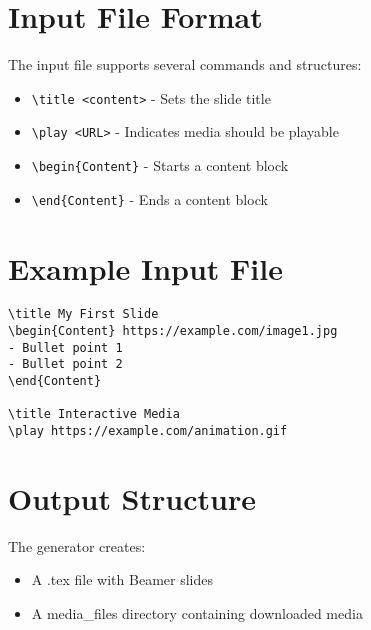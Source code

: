 \documentclass{article}
\begin{document}
\section{Input File Format}
The input file supports several commands and structures:

\begin{tcolorbox}[title=Commands]
\begin{itemize}
    \item \texttt{\textbackslash title <content>} - Sets the slide title
    \item \texttt{\textbackslash play <URL>} - Indicates media should be playable
    \item \texttt{\textbackslash begin\{Content\}} - Starts a content block
    \item \texttt{\textbackslash end\{Content\}} - Ends a content block
\end{itemize}
\end{tcolorbox}

\section{Example Input File}
\begin{tcolorbox}[enhanced]  %
\begin{verbatim}
\title My First Slide
\begin{Content} https://example.com/image1.jpg
- Bullet point 1
- Bullet point 2
\end{Content}

\title Interactive Media
\play https://example.com/animation.gif
\end{verbatim}
\end{tcolorbox}

\section{Output Structure}
The generator creates:
\begin{itemize}
    \item A .tex file with Beamer slides
    \item A media\_files directory containing downloaded media
\end{itemize}
\end{document}
